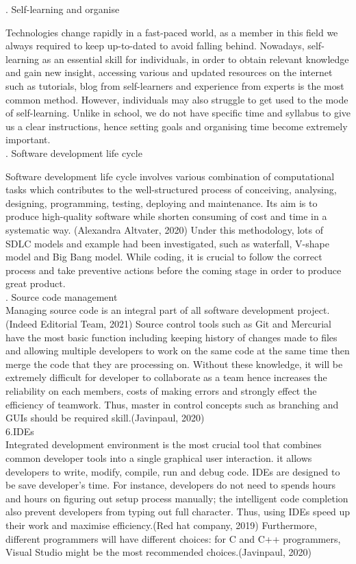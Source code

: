 \documentclass[a4paper, 11pt]{report}
\begin{document}
. Self-learning and organise

\noindent Technologies change rapidly in a fast-paced world, as a member in this field we always required to keep up-to-dated to avoid falling behind. Nowadays, self-learning as an essential skill for individuals, in order to obtain relevant knowledge and gain new insight, accessing various and updated resources on the internet such as tutorials, blog from self-learners and experience from experts is the most common method. However, individuals may also struggle to get used to the mode of self-learning. Unlike in school, we do not have specific time and syllabus to give us a clear instructions, hence setting goals and organising time become extremely important.\\

. Software development life cycle

\noindent Software development life cycle involves various combination of computational tasks which contributes to the well-structured process of conceiving, analysing, designing, programming, testing, deploying and maintenance. Its aim is to produce high-quality software while shorten consuming of cost and time in a systematic way. (Alexandra Altvater, 2020) Under this methodology, lots of SDLC models and example had been investigated, such as waterfall, V-shape model and Big Bang model. While coding, it is crucial to follow the correct process and take preventive actions before the coming stage in order to produce great product.\\  

. Source code management\\
\noindent Managing source code is an integral part of all software development project.(Indeed Editorial Team, 2021) Source control tools such as Git and Mercurial have the most basic function including keeping history of changes made to files  and allowing multiple developers to work on the same code at the same time then merge the code that they are processing on. Without these knowledge, it will be extremely difficult for developer to collaborate as a team hence increases the reliability on each members, costs of making errors and strongly effect the efficiency of teamwork. Thus, master in control concepts such as branching and GUIs should be required skill.(Javinpaul, 2020)\\

\noindent 6.IDEs\\
\noindent Integrated development environment is the most crucial tool that combines common developer tools into a single graphical user interaction. it allows developers to write, modify, compile, run and debug code. IDEs are designed to be save developer's time. For instance, developers do not need to spends hours and hours on figuring out setup process manually; the intelligent code completion also prevent developers from typing out full character. Thus, using IDEs speed up their work and maximise efficiency.(Red hat company, 2019) Furthermore, different programmers will have different choices: for C and C++ programmers, Visual Studio might be the most recommended choices.(Javinpaul, 2020)\\  
\end{document}
